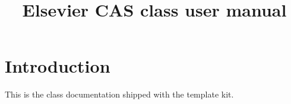 \documentclass[a4paper]{article}
\begin{document}
\title{Elsevier CAS class user manual}
\section{Introduction}
This is the class documentation shipped with the template kit.
\end{document}
